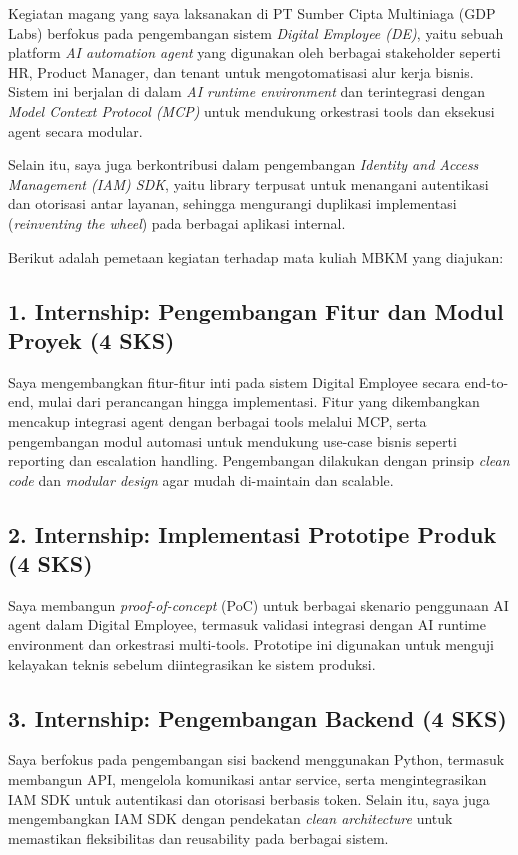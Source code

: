 \documentclass[a4paper,12pt]{article}
\begin{document}
Kegiatan magang yang saya laksanakan di PT Sumber Cipta Multiniaga (GDP Labs) berfokus pada pengembangan sistem \textit{Digital Employee (DE)}, yaitu sebuah platform \textit{AI automation agent} yang digunakan oleh berbagai stakeholder seperti HR, Product Manager, dan tenant untuk mengotomatisasi alur kerja bisnis. Sistem ini berjalan di dalam \textit{AI runtime environment} dan terintegrasi dengan \textit{Model Context Protocol (MCP)} untuk mendukung orkestrasi tools dan eksekusi agent secara modular.

Selain itu, saya juga berkontribusi dalam pengembangan \textit{Identity and Access Management (IAM) SDK}, yaitu library terpusat untuk menangani autentikasi dan otorisasi antar layanan, sehingga mengurangi duplikasi implementasi (\textit{reinventing the wheel}) pada berbagai aplikasi internal.

Berikut adalah pemetaan kegiatan terhadap mata kuliah MBKM yang diajukan:

\subsection*{1. Internship: Pengembangan Fitur dan Modul Proyek (4 SKS)}
Saya mengembangkan fitur-fitur inti pada sistem Digital Employee secara end-to-end, mulai dari perancangan hingga implementasi. Fitur yang dikembangkan mencakup integrasi agent dengan berbagai tools melalui MCP, serta pengembangan modul automasi untuk mendukung use-case bisnis seperti reporting dan escalation handling. Pengembangan dilakukan dengan prinsip \textit{clean code} dan \textit{modular design} agar mudah di-maintain dan scalable.

\subsection*{2. Internship: Implementasi Prototipe Produk (4 SKS)}
Saya membangun \textit{proof-of-concept} (PoC) untuk berbagai skenario penggunaan AI agent dalam Digital Employee, termasuk validasi integrasi dengan AI runtime environment dan orkestrasi multi-tools. Prototipe ini digunakan untuk menguji kelayakan teknis sebelum diintegrasikan ke sistem produksi.

\subsection*{3. Internship: Pengembangan Backend (4 SKS)}
Saya berfokus pada pengembangan sisi backend menggunakan Python, termasuk membangun API, mengelola komunikasi antar service, serta mengintegrasikan IAM SDK untuk autentikasi dan otorisasi berbasis token. Selain itu, saya juga mengembangkan IAM SDK dengan pendekatan \textit{clean architecture} untuk memastikan fleksibilitas dan reusability pada berbagai sistem.
\end{document}
